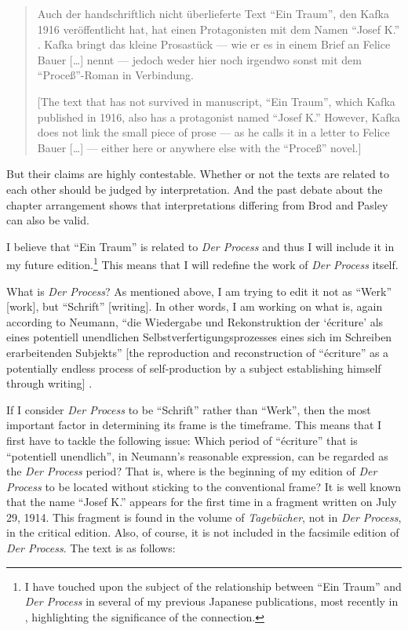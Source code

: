 \documentclass{article}
\begin{document}
\begin{quote}
Auch der handschriftlich nicht überlieferte Text ``Ein Traum'', den Kafka
1916 veröffentlicht hat, hat einen Protagonisten mit dem Namen ``Josef
K.'' . Kafka bringt das kleine Prosastück –– wie er es in einem Brief an
Felice Bauer [\ldots] nennt –– jedoch weder hier noch irgendwo sonst
mit dem ``Proceß''-Roman in Verbindung. 

\begin{flushright}
    \parencite[73]{kafka_zur_1990}
\end{flushright}

{[}The text that has not survived in manuscript, ``Ein Traum'', which
Kafka published in 1916, also has a protagonist named ``Josef K.''
However, Kafka does not link the small piece of prose –– as he calls it
in a letter to Felice Bauer [\ldots] –– either here or anywhere else
with the ``Proceß'' novel.{]}
\end{quote}

But their claims are highly contestable. Whether or not the texts are
related to each other should be judged by interpretation. And the past
debate about the chapter arrangement shows that interpretations
differing from Brod and Pasley can also be valid.

I believe that ``Ein Traum'' is related to \emph{Der Process} and thus I
will include it in my future edition.\footnote{I have touched upon the subject of the relationship between ``Ein Traum'' and \emph{Der Process} in several of my previous Japanese publications, most recently in \citet{myojo_kafka_2015}, highlighting the significance of the connection.} This means that I will redefine
the work of \emph{Der Process} itself.

What is \emph{Der Process}? As mentioned above, I am trying to edit it
not as ``Werk'' {[}work{]}, but ``Schrift'' {[}writing{]}. In other words, I am working on what
is, again according to Neumann, ``die Wiedergabe und Rekonstruktion der
`écriture' als eines potentiell unendlichen Selbstverfertigungsprozesses
eines sich im Schreiben erarbeitenden Subjekts'' {[}the reproduction
and reconstruction of ``écriture'' as a potentially endless process of
self-production by a subject establishing himself through writing{]}
\citep[161]{neumann_werk_1981}.

If I consider \emph{Der Process} to be ``Schrift'' rather than ``Werk'',
then the most important factor in determining its frame is the
timeframe. This means that I first have to tackle the following issue:
Which period of ``écriture'' that is ``potentiell unendlich'', in Neumann's
reasonable expression, can be regarded as the \emph{Der Process} period?
That is, where is the beginning of my edition of \emph{Der Process} to
be located without sticking to the conventional frame? It is well known
that the name ``Josef K.'' appears for the first time in a fragment
written on July 29, 1914. This fragment is found in the volume of
\emph{Tagebücher}, not in \emph{Der Process}, in the
critical edition. Also, of course, it is not included in the facsimile
edition of \emph{Der Process}. The text is as follows:
\end{document}
